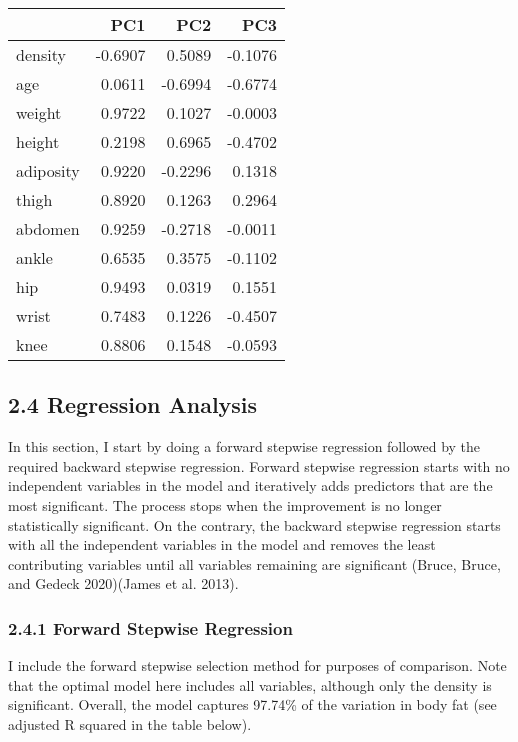 \documentclass[
]{article}
\begin{document}
\begin{tabular}{l|r|r|r}
\hline
  & PC1 & PC2 & PC3\\
\hline
density & -0.6907 & 0.5089 & -0.1076\\
\hline
age & 0.0611 & -0.6994 & -0.6774\\
\hline
weight & 0.9722 & 0.1027 & -0.0003\\
\hline
height & 0.2198 & 0.6965 & -0.4702\\
\hline
adiposity & 0.9220 & -0.2296 & 0.1318\\
\hline
thigh & 0.8920 & 0.1263 & 0.2964\\
\hline
abdomen & 0.9259 & -0.2718 & -0.0011\\
\hline
ankle & 0.6535 & 0.3575 & -0.1102\\
\hline
hip & 0.9493 & 0.0319 & 0.1551\\
\hline
wrist & 0.7483 & 0.1226 & -0.4507\\
\hline
knee & 0.8806 & 0.1548 & -0.0593\\
\hline
\end{tabular}

\hypertarget{regression-analysis}{%
\subsection{\texorpdfstring{\textbf{2.4 Regression
Analysis}}{2.4 Regression Analysis}}\label{regression-analysis}}

In this section, I start by doing a forward stepwise regression followed
by the required backward stepwise regression. Forward stepwise
regression starts with no independent variables in the model and
iteratively adds predictors that are the most significant. The process
stops when the improvement is no longer statistically significant. On
the contrary, the backward stepwise regression starts with all the
independent variables in the model and removes the least contributing
variables until all variables remaining are significant (Bruce, Bruce,
and Gedeck 2020)(James et al. 2013).

\hypertarget{forward-stepwise-regression}{%
\subsubsection{\texorpdfstring{\textbf{2.4.1 Forward Stepwise
Regression}}{2.4.1 Forward Stepwise Regression}}\label{forward-stepwise-regression}}

I include the forward stepwise selection method for purposes of
comparison. Note that the optimal model here includes all variables,
although only the density is significant. Overall, the model captures
97.74\% of the variation in body fat (see adjusted R squared in the
table below).
\end{document}
